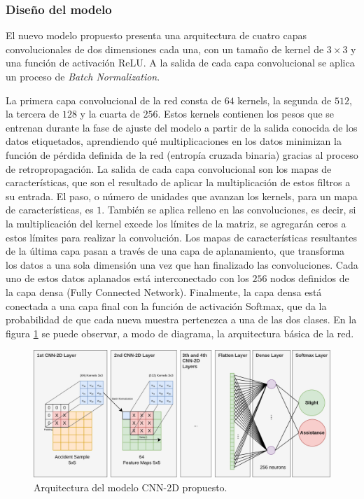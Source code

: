 \documentclass{uathesis-es}
\begin{document}
\subsubsection{Diseño del modelo}

El nuevo modelo propuesto presenta una arquitectura de cuatro capas convolucionales de dos dimensiones cada una, con un tamaño de kernel de $3 \times 3$ y una función de activación ReLU. A la salida de cada capa convolucional se aplica un proceso de \textit{Batch Normalization}.

La primera capa convolucional de la red consta de $64$ kernels, la segunda de $512$, la tercera de $128$ y la cuarta de $256$. Estos kernels contienen los pesos que se entrenan durante la fase de ajuste del modelo a partir de la salida conocida de los datos etiquetados, aprendiendo qué multiplicaciones en los datos minimizan la función de pérdida definida de la red (entropía cruzada binaria) gracias al proceso de retropropagación. La salida de cada capa convolucional son los mapas de características, que son el resultado de aplicar la multiplicación de estos filtros a su entrada. El paso, o número de unidades que avanzan los kernels, para un mapa de características, es $1$. También se aplica relleno en las convoluciones, es decir, si la multiplicación del kernel excede los límites de la matriz, se agregarán ceros a estos límites para realizar la convolución. Los mapas de características resultantes de la última capa pasan a través de una capa de aplanamiento, que transforma los datos a una sola dimensión una vez que han finalizado las convoluciones. Cada uno de estos datos aplanados está interconectado con los $256$ nodos definidos de la capa densa (Fully Connected Network). Finalmente, la capa densa está conectada a una capa final con la función de activación Softmax, que da la probabilidad de que cada nueva muestra pertenezca a una de las dos clases. En la figura \ref{CNN2DArchitecture} se puede observar, a modo de diagrama, la arquitectura básica de la red.

\begin{figure}[H]
    \centering
    \includegraphics[width=15cm]{Figures/SIMPLE.png}
    \caption{Arquitectura del modelo CNN-2D propuesto.}
    \label{CNN2DArchitecture}
\end{figure}
\end{document}
